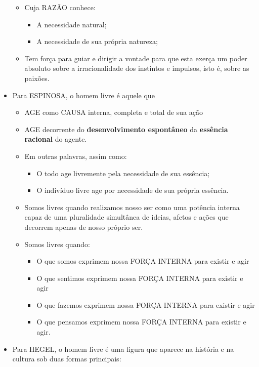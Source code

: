 \documentclass[
]{book}
\providecommand{\tightlist}{%
  \setlength{\itemsep}{0pt}\setlength{\parskip}{0pt}}
\begin{document}
\begin{itemize}
  \begin{itemize}
  \tightlist
  \item
    Cuja RAZÃO conhece:

    \begin{itemize}
    \tightlist
    \item
      A necessidade natural;
    \item
      A necessidade de sua própria natureza;
    \end{itemize}
  \item
    Tem força para guiar e dirigir a vontade para que esta exerça um poder absoluto sobre a irracionalidade dos instintos e impulsos, isto é, sobre as paixões.
  \end{itemize}
\item
  Para ESPINOSA, o homem livre é aquele que

  \begin{itemize}
  \tightlist
  \item
    AGE como CAUSA interna, completa e total de sua ação
  \item
    AGE decorrente do \textbf{desenvolvimento espontâneo} da \textbf{essência racional} do agente.
  \item
    Em outras palavras, assim como:

    \begin{itemize}
    \tightlist
    \item
      O todo age livremente pela necessidade de sua essência;
    \item
      O indivíduo livre age por necessidade de sua própria essência.
    \end{itemize}
  \item
    Somos livres quando realizamos nosso ser como uma potência interna capaz de uma pluralidade simultânea de ideias, afetos e ações que decorrem apenas de nosso próprio ser.
  \item
    Somos livres quando:

    \begin{itemize}
    \tightlist
    \item
      O que somos exprimem nossa FORÇA INTERNA para existir e agir
    \item
      O que sentimos exprimem nossa FORÇA INTERNA para existir e agir
    \item
      O que fazemos exprimem nossa FORÇA INTERNA para existir e agir
    \item
      O que pensamos exprimem nossa FORÇA INTERNA para existir e agir.
    \end{itemize}
  \end{itemize}
\item
  Para HEGEL, o homem livre é uma figura que aparece na história e na cultura sob duas formas principais:


\end{itemize}
\end{document}
